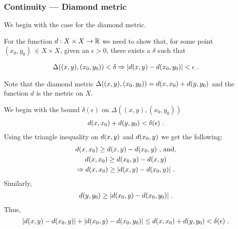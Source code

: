 \begin{frame}
    \frametitle{Continuity --- Diamond metric}

    We begin with the case for the
    diamond metric.

    \pause

    For the function \(d: X\times X \to \mathbb{R}\) we need to show that, for some point \((x_0, y_0)\ \in X\times X \),
    given an \(\epsilon > 0\), there exists a \(\delta\) such that 

    \begin{gather}
        \Delta((x, y), (x_0, y_0)) < \delta \Rightarrow |d(x, y) - d(x_0, y_0)| < \epsilon~.
    \end{gather}

    Note that the diamond metric \(\Delta((x, y), (x_0, y_0)) = d(x, x_0) + d(y, y_0)\)
    and the function \(d\) is the metric on \(X\).

    
\end{frame}

\begin{frame}
    We begin with the bound \(\delta(\epsilon)\) on \(\Delta((x, y), (x_0, y_0))\) 
    \begin{gather*}
        d(x, x_0) + d(y, y_0) < \delta(\epsilon)~.
    \end{gather*}
    \pause
    Using the triangle inequality on \(d(x, y)\) and \(d(x_0, y)\)
    we get the following:
    \begin{gather*}
        d(x, x_0) \geq d(x, y) - d(x_0, y)
        \text{ , and,}\\ d(x, x_0) \geq d(x_0, y) - d(x, y) \\
        \Rightarrow d(x, x_0) \geq |d(x, y) - d(x_0, y)|~.
    \end{gather*}
    \pause
    Similarly,
    \begin{gather*}
        d(y, y_0) \geq |d(x_0, y) - d(x_0, y_0)|~.
    \end{gather*}
    \pause
    Thus,
    \begin{equation*}
        |d(x, y) - d(x_0, y)| + |d(x_0, y) - d(x_0, y_0)| \leq d(x, x_0) + d(y, y_0) < \delta(\epsilon)~.
    \end{equation*}
\end{frame}


